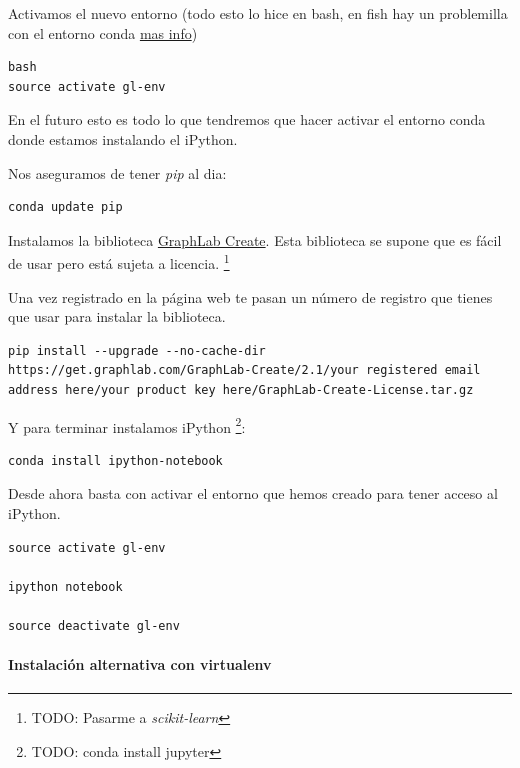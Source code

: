 \documentclass[12pt,spanish,]{article}
\let\oldparagraph\paragraph
\renewcommand{\paragraph}[1]{\oldparagraph{#1}\mbox{}}
\begin{document}
Activamos el nuevo entorno (todo esto lo hice en bash, en fish hay un
problemilla con el entorno conda
\href{https://penandpants.com/2014/02/28/using-conda-environments-and-the-fish-shell/}{mas
info})

\begin{verbatim}
bash
source activate gl-env
\end{verbatim}

En el futuro esto es todo lo que tendremos que hacer activar el entorno
conda donde estamos instalando el iPython.

Nos aseguramos de tener \emph{pip} al dia:

\begin{verbatim}
conda update pip
\end{verbatim}

Instalamos la biblioteca
\href{https://turi.com/products/create/}{GraphLab Create}. Esta
biblioteca se supone que es fácil de usar pero está sujeta a licencia.
\footnote{TODO: Pasarme a \emph{scikit-learn}}

Una vez registrado en la página web te pasan un número de registro que
tienes que usar para instalar la biblioteca.

\begin{verbatim}
pip install --upgrade --no-cache-dir https://get.graphlab.com/GraphLab-Create/2.1/your registered email address here/your product key here/GraphLab-Create-License.tar.gz
\end{verbatim}

Y para terminar instalamos iPython \footnote{TODO: conda install jupyter}:

\begin{verbatim}
conda install ipython-notebook
\end{verbatim}

Desde ahora basta con activar el entorno que hemos creado para tener
acceso al iPython.

\begin{verbatim}
source activate gl-env

ipython notebook

source deactivate gl-env
\end{verbatim}

\paragraph{Instalación alternativa con
virtualenv}\label{instalaciuxf3n-alternativa-con-virtualenv}
\end{document}
